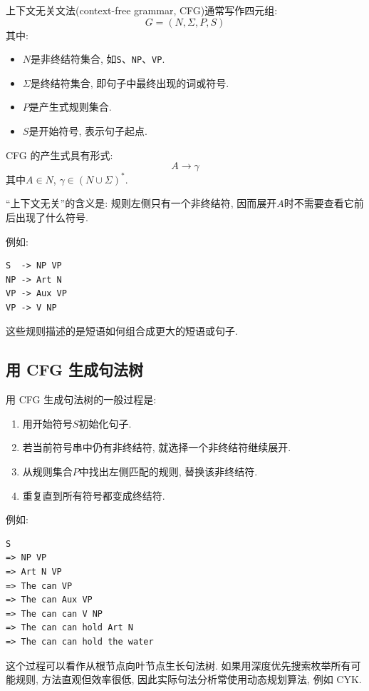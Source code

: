 上下文无关文法(context-free grammar, CFG)通常写作四元组:
\[
G = (N, \Sigma, P, S)
\]
其中:

\begin{itemize}
\item $N$是非终结符集合, 如\texttt{S}、\texttt{NP}、\texttt{VP}.
\item $\Sigma$是终结符集合, 即句子中最终出现的词或符号.
\item $P$是产生式规则集合.
\item $S$是开始符号, 表示句子起点.
\end{itemize}

CFG 的产生式具有形式:
\[
A \to \gamma
\]
其中$A \in N$, $\gamma \in (N \cup \Sigma)^*$.

“上下文无关”的含义是:
规则左侧只有一个非终结符, 因而展开$A$时不需要查看它前后出现了什么符号.

例如:

\begin{Verbatim}[breaklines=true,breakanywhere=true,fontsize=\small]
S  -> NP VP
NP -> Art N
VP -> Aux VP
VP -> V NP
\end{Verbatim}

这些规则描述的是短语如何组合成更大的短语或句子.

\subsection{用 CFG 生成句法树}


用 CFG 生成句法树的一般过程是:

\begin{enumerate}
\item[1.] 用开始符号$S$初始化句子.
\item[2.] 若当前符号串中仍有非终结符, 就选择一个非终结符继续展开.
\item[3.] 从规则集合$P$中找出左侧匹配的规则, 替换该非终结符.
\item[4.] 重复直到所有符号都变成终结符.
\end{enumerate}

例如:

\begin{Verbatim}[breaklines=true,breakanywhere=true,fontsize=\small]
S
=> NP VP
=> Art N VP
=> The can VP
=> The can Aux VP
=> The can can V NP
=> The can can hold Art N
=> The can can hold the water
\end{Verbatim}

这个过程可以看作从根节点向叶节点生长句法树.
如果用深度优先搜索枚举所有可能规则, 方法直观但效率很低,
因此实际句法分析常使用动态规划算法, 例如 CYK.

